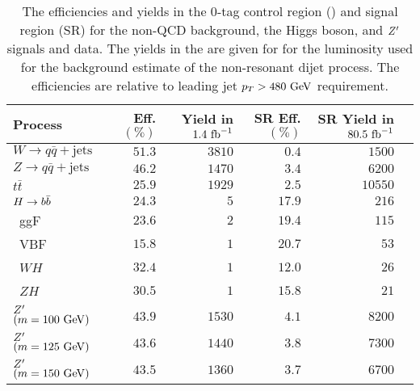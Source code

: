 \begin{table}[htpb]
 \centering
 \caption[Efficiencies and yields of resonant backgrounds and the signal processes.]{%
  The efficiencies and yields in the $0$-tag control region (\CRQCD{}) and signal region (SR) for the non-QCD background, the Higgs boson, and $Z'$ signals and data.
  The yields in the \CRQCD{} are given for for the luminosity used for the background estimate of the non-resonant dijet process.
  The efficiencies are relative to leading \largeR{} jet $p_{T} > 480~\mathrm{GeV}$ requirement.}
 \begin{tabular}{@{}lrrrrr@{}}
  \toprule
  Process                             & \CRQCD{} Eff. $(\%)$ & \CRQCD{} Yield in $1.4~\mathrm{fb}^{-1}$ & SR Eff. $(\%)$ & SR Yield in $80.5~\mathrm{fb}^{-1}$ \\ \midrule
  $W \to q\bar{q} + \mathrm{jets}$    & $51.3$               & $3810$                       & $0.4$          & $1500$                  \\
  $Z \to q\bar{q} + \mathrm{jets}$    & $46.2$               & $1470$                       & $3.4$          & $6200$                  \\
  $t\bar{t}$                          & $25.9$               & $1929$                       & $2.5$          & $10550$                 \\
  $\Hbb$                              & $24.3$               & $5$                          & $17.9$         & $216$                   \\
  \phantom{$\Hbb$\quad}~ggF           & $23.6$               & $2$                          & $19.4$         & $115$                   \\
  \phantom{$\Hbb$\quad}~VBF           & $15.8$               & $1$                          & $20.7$         & $53$                    \\
  \phantom{$\Hbb$\quad}~$WH$          & $32.4$               & $1$                          & $12.0$         & $26$                    \\
  \phantom{$\Hbb$\quad}~$ZH$          & $30.5$               & $1$                          & $15.8$         & $21$                    \\
  $Z'$ $\left(m=100~\mathrm{GeV}\right)$ & $43.9$               & $1530$                       & $4.1$          & $8200$                  \\
  $Z'$ $\left(m=125~\mathrm{GeV}\right)$ & $43.6$               & $1440$                       & $3.8$          & $7300$                  \\
  $Z'$ $\left(m=150~\mathrm{GeV}\right)$ & $43.5$               & $1360$                       & $3.7$          & $6700$                  \\

\end{tabular}
\end{table}
